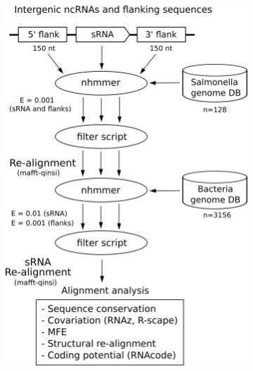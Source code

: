 \begin{figure}[H]
\begin{subfigure}{0.49\textwidth}
\includegraphics[scale=0.5]{sal/alternative_flowchart.png} 
\end{subfigure}
\begin{subfigure}{0.49\textwidth}

\end{subfigure}
\end{figure}
